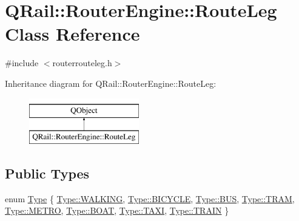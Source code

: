 \hypertarget{classQRail_1_1RouterEngine_1_1RouteLeg}{}\section{Q\+Rail\+::Router\+Engine\+::Route\+Leg Class Reference}
\label{classQRail_1_1RouterEngine_1_1RouteLeg}


{\ttfamily \#include $<$routerrouteleg.\+h$>$}

Inheritance diagram for Q\+Rail\+::Router\+Engine\+::Route\+Leg\+:\begin{figure}[H]
\begin{center}
\leavevmode
\includegraphics[height=2.000000cm]{classQRail_1_1RouterEngine_1_1RouteLeg}
\end{center}
\end{figure}
\subsection*{Public Types}
\begin{DoxyCompactItemize}
\item 
enum \mbox{\hyperlink{classQRail_1_1RouterEngine_1_1RouteLeg_af31dfcc23f2ae80f7fb0feca24cb9816}{Type}} \{ \newline
\mbox{\hyperlink{classQRail_1_1RouterEngine_1_1RouteLeg_af31dfcc23f2ae80f7fb0feca24cb9816a606c114184493a665cf1f6a12fbab9d3}{Type\+::\+W\+A\+L\+K\+I\+NG}}, 
\mbox{\hyperlink{classQRail_1_1RouterEngine_1_1RouteLeg_af31dfcc23f2ae80f7fb0feca24cb9816a4bdeeb2e61c16dbc81956e1bd9148809}{Type\+::\+B\+I\+C\+Y\+C\+LE}}, 
\mbox{\hyperlink{classQRail_1_1RouterEngine_1_1RouteLeg_af31dfcc23f2ae80f7fb0feca24cb9816a0e0c9d888d1093cb2dfa6b25cbce19d8}{Type\+::\+B\+US}}, 
\mbox{\hyperlink{classQRail_1_1RouterEngine_1_1RouteLeg_af31dfcc23f2ae80f7fb0feca24cb9816a0d8fcfacbca6d7ab6fa25ebadb85aa88}{Type\+::\+T\+R\+AM}}, 
\newline
\mbox{\hyperlink{classQRail_1_1RouterEngine_1_1RouteLeg_af31dfcc23f2ae80f7fb0feca24cb9816ab7c96478c96d5fff50bc14fb2d33e144}{Type\+::\+M\+E\+T\+RO}}, 
\mbox{\hyperlink{classQRail_1_1RouterEngine_1_1RouteLeg_af31dfcc23f2ae80f7fb0feca24cb9816a45341cc1cc5a485ca18fd816b833175b}{Type\+::\+B\+O\+AT}}, 
\mbox{\hyperlink{classQRail_1_1RouterEngine_1_1RouteLeg_af31dfcc23f2ae80f7fb0feca24cb9816a7086a7774c0003961e43955ec716cb9f}{Type\+::\+T\+A\+XI}}, 
\mbox{\hyperlink{classQRail_1_1RouterEngine_1_1RouteLeg_af31dfcc23f2ae80f7fb0feca24cb9816acf72425b33c7bcc6d1692b0793e1a8b1}{Type\+::\+T\+R\+A\+IN}}
 \}
\end{DoxyCompactItemize}
